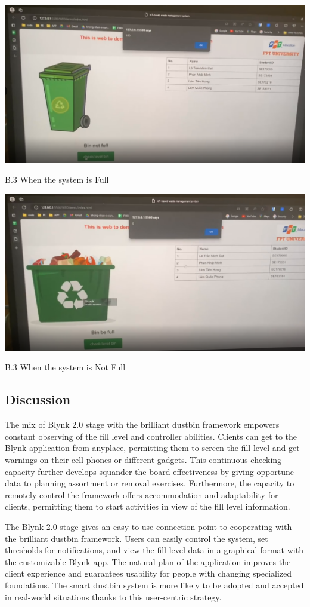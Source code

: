 \documentclass[conference, onecolumn]{IEEEtran}
\begin{document}
\begin{center}
\centerline{\includegraphics[width=3.8 in]{full.png}}
B.3 When the system is Full 
\end{center}

\begin{center}
\centerline{\includegraphics[width=3.8 in]{notfull.png}}
B.3 When the system is Not Full 
\end{center}

\subsection{Discussion}
The mix of Blynk 2.0 stage with the brilliant dustbin framework empowers constant observing of the fill level and controller abilities. Clients can get to the Blynk application from anyplace, permitting them to screen the fill level and get warnings on their cell phones or different gadgets. This continuous checking capacity further develops squander the board effectiveness by giving opportune data to planning assortment or removal exercises. Furthermore, the capacity to remotely control the framework offers accommodation and adaptability for clients, permitting them to start activities in view of the fill level information.

The Blynk 2.0 stage gives an easy to use connection point to cooperating with the brilliant dustbin framework. Users can easily control the system, set thresholds for notifications, and view the fill level data in a graphical format with the customizable Blynk app. The natural plan of the application improves the client experience and guarantees usability for people with changing specialized foundations. The smart dustbin system is more likely to be adopted and accepted in real-world situations thanks to this user-centric strategy.
\end{document}
